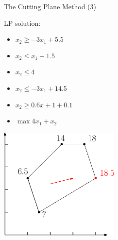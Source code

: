 \documentclass[10pt]{beamer}
\begin{document}
\begin{frame}[t]{The Cutting Plane Method (3)}
        \begin{minipage}[t]{0.48\textwidth}
            LP solution:
            \begin{itemize}
                \item $ x_2 \geq -3x_1 + 5.5 $
                \item $ x_2 \leq x_1 + 1.5 $
                \item $ x_2 \leq 4$
                \item $ x_2 \leq -3x_1 + 14.5 $
                \item $ x_2 \geq 0.6x+1 + 0.1 $
                \item \alert{$ \max 4x_1 + x_2 $}
            \end{itemize}
        \end{minipage}
        \begin{minipage}[t]{0.48\textwidth}
            \begin{center}
                \includegraphics[width=6cm]{cutting_plane006.eps} 
            \end{center}
        \end{minipage}        
\end{frame}
\end{document}
